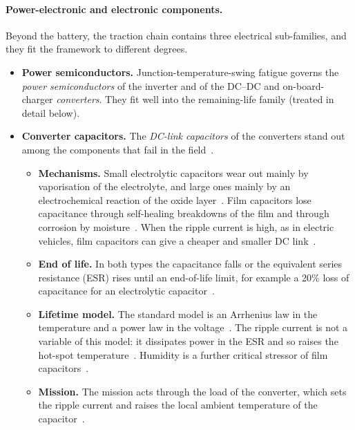 \documentclass[11pt,a4paper]{article}
\theoremstyle{plain}
\theoremstyle{definition}
\theoremstyle{remark}
\begin{document}
\paragraph{Power-electronic and electronic components.}
Beyond the battery, the traction chain contains three electrical sub-families, and they fit the framework to different degrees.
\begin{itemize}
  \item \textbf{Power semiconductors.}
    Junction-temperature-swing fatigue governs the \emph{power semiconductors} of the inverter and of the DC--DC and on-board-charger \emph{converters}.
    They fit well into the remaining-life family (treated in detail below).
  \item \textbf{Converter capacitors.}
    The \emph{DC-link capacitors} of the converters stand out among the components that fail in the field~\cite[Sec.~I]{WangBlaabjerg2014}.
    \begin{itemize}
      \item \textbf{Mechanisms.} Small electrolytic capacitors wear out mainly by vaporisation of the electrolyte, and large ones mainly by an electrochemical reaction of the oxide layer~\cite[Sec.~III-A]{WangBlaabjerg2014}.
        Film capacitors lose capacitance through self-healing breakdowns of the film and through corrosion by moisture~\cite[Sec.~III-A, Table~II]{WangBlaabjerg2014}.
        When the ripple current is high, as in electric vehicles, film capacitors can give a cheaper and smaller DC link~\cite[Sec.~II]{WangBlaabjerg2014}.
      \item \textbf{End of life.} In both types the capacitance falls or the equivalent series resistance (ESR) rises until an end-of-life limit, for example a 20\% loss of capacitance for an electrolytic capacitor~\cite[Table~III]{WangBlaabjerg2014}.
      \item \textbf{Lifetime model.} The standard model is an Arrhenius law in the temperature and a power law in the voltage~\cite[Eqs.~(1)--(2)]{WangBlaabjerg2014}.
        The ripple current is not a variable of this model: it dissipates power in the ESR and so raises the hot-spot temperature~\cite[Table~I, Secs.~IV-B and~V, Fig.~10]{WangBlaabjerg2014}.
        Humidity is a further critical stressor of film capacitors~\cite[Table~II]{WangBlaabjerg2014}.
      \item \textbf{Mission.} The mission acts through the load of the converter, which sets the ripple current and raises the local ambient temperature of the capacitor~\cite[Sec.~IV, Fig.~7]{WangBlaabjerg2021}.

\end{itemize}
\end{itemize}
\end{document}
